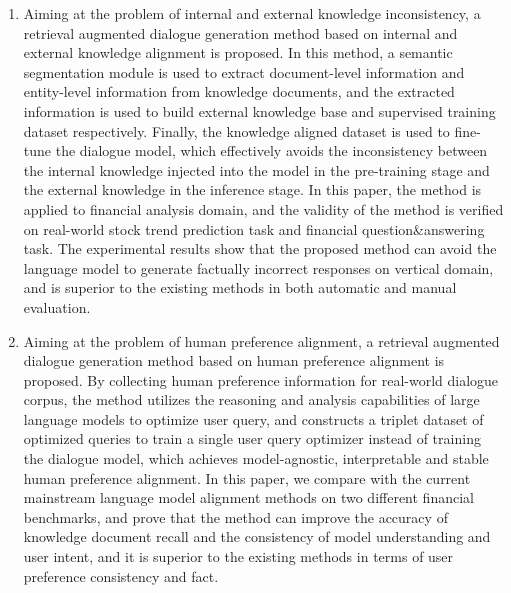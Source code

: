\begin{enumerate}[topsep = 0 pt, itemsep= 0 pt, parsep=0pt, partopsep=0pt, leftmargin=0pt, itemindent=44pt, labelsep=6pt, listparindent=24pt, label=\arabic*)]
	\item Aiming at the problem of internal and external knowledge inconsistency, a retrieval augmented dialogue generation method based on internal and external knowledge alignment is proposed. In this method, a semantic segmentation module is used to extract document-level information and entity-level information from knowledge documents, and the extracted information is used to build external knowledge base and supervised training dataset respectively. Finally, the knowledge aligned dataset is used to fine-tune the dialogue model, which effectively avoids the inconsistency between the internal knowledge injected into the model in the pre-training stage and the external knowledge in the inference stage. In this paper, the method is applied to financial analysis domain, and the validity of the method is verified on real-world stock trend prediction task and financial question\&answering task. The experimental results show that the proposed method can avoid the language model to generate factually incorrect responses on vertical domain, and is superior to the existing methods in both automatic and manual evaluation.

	\item Aiming at the problem of human preference alignment, a retrieval augmented dialogue generation method based on human preference alignment is proposed. By collecting human preference information for real-world dialogue corpus, the method utilizes the reasoning and analysis capabilities of large language models to optimize user query, and constructs a triplet dataset of optimized queries to train a single user query optimizer instead of training the dialogue model, which achieves model-agnostic, interpretable and stable human preference alignment. In this paper, we compare with the current mainstream language model alignment methods on two different financial benchmarks, and prove that the method can improve the accuracy of knowledge document recall and the consistency of model understanding and user intent, and it is superior to the existing methods in terms of user preference consistency and fact.
\end{enumerate}

